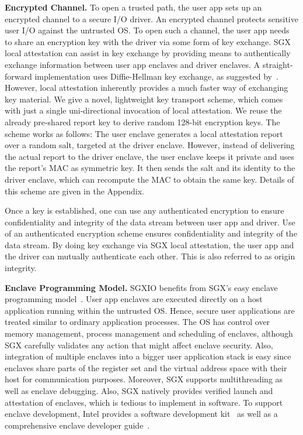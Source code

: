 \documentclass{sig-alternate-05-2015}
\begin{document}
\textbf{Encrypted Channel.}
To open a trusted path, the user app sets up an encrypted channel to a secure I/O driver. 
An encrypted channel protects sensitive user I/O against the untrusted OS. 
To open such a channel, the user app needs to share an encryption key with the driver via some form of key exchange. 
SGX local attestation can assist in key exchange by providing means to authentically exchange information between user app enclaves and driver enclaves. 
A straight-forward implementation uses Diffie-Hellman key exchange, as suggested by~\cite{anati_innovative_2013,sgxsdk}. 
However, local attestation inherently provides a much faster way of exchanging key material. 
We give a novel, lightweight key transport scheme, which comes with just a single uni-directional invocation of local attestation. 
We reuse the already pre-shared report key to derive random 128-bit encryption keys. 
The scheme works as follows: 
The user enclave generates a local attestation report over a random salt, targeted at the driver enclave. 
However, instead of delivering the actual report to the driver enclave, the user enclave keeps it private and uses the report's MAC as symmetric key. 
It then sends the salt and its identity to the driver enclave, which can recompute the MAC to obtain the same key. 
Details of this scheme are given in the Appendix. 

Once a key is established, one can use any authenticated encryption to ensure confidentiality and integrity of the data stream between user app and driver. 
Use of an authenticated encryption scheme ensures confidentiality and integrity of the data stream. 
By doing key exchange via SGX local attestation, the user app and the driver can mutually authenticate each other. 
This is also referred to as origin integrity. 

\textbf{Enclave Programming Model.}
SGXIO benefits from SGX's easy enclave programming model~\cite{sgxdevguide,sgxtutorial}. 
User app enclaves are executed directly on a host application running within the untrusted OS. 
Hence, secure user applications are treated similar to ordinary application processes. 
The OS has control over memory management, process management and scheduling of enclaves, although SGX carefully validates any action that might affect enclave security. 
Also, integration of multiple enclaves into a bigger user application stack is easy since enclaves share parts of the register set and the virtual address space with their host for communication purposes. 
Moreover, SGX supports multithreading as well as enclave debugging. 
Also, SGX natively provides verified launch and attestation of enclaves, which is tedious to implement in software. 
To support enclave development, Intel provides a software development kit~\cite{sgxsdk} as well as a comprehensive enclave developer guide~\cite{sgxdevguide}. 
\end{document}
